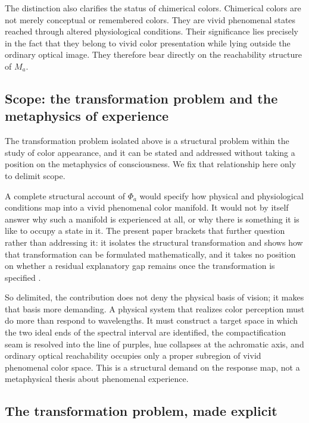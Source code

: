 \documentclass[preprint,12pt,authoryear]{elsarticle}
\theoremstyle{plain}
\theoremstyle{definition}
\theoremstyle{remark}
\begin{document}
The distinction also clarifies the status of chimerical colors. Chimerical colors are not merely conceptual or remembered colors. They are vivid phenomenal states reached through altered physiological conditions. Their significance lies precisely in the fact that they belong to vivid color presentation while lying outside the ordinary optical image. They therefore bear directly on the reachability structure of $M_a$.

\subsection{Scope: the transformation problem and the metaphysics of experience}
\label{subsec:scope-metaphysics}

\noindent The transformation problem isolated above is a structural problem within the study of color appearance, and it can be stated and addressed without taking a position on the metaphysics of consciousness. We fix that relationship here only to delimit scope.

A complete structural account of $\Phi_a$ would specify how physical and physiological conditions map into a vivid phenomenal color manifold. It would not by itself answer why such a manifold is experienced at all, or why there is something it is like to occupy a state in it. The present paper brackets that further question rather than addressing it: it isolates the structural transformation and shows how that transformation can be formulated mathematically, and it takes no position on whether a residual explanatory gap remains once the transformation is specified \citep{Chalmers2010,Stoljar2010}.

So delimited, the contribution does not deny the physical basis of vision; it makes that basis more demanding. A physical system that realizes color perception must do more than respond to wavelengths. It must construct a target space in which the two ideal ends of the spectral interval are identified, the compactification seam is resolved into the line of purples, hue collapses at the achromatic axis, and ordinary optical reachability occupies only a proper subregion of vivid phenomenal color space. This is a structural demand on the response map, not a metaphysical thesis about phenomenal experience.

\subsection{The transformation problem, made explicit}
\label{subsec:transformation-problem-explicit}
\end{document}
